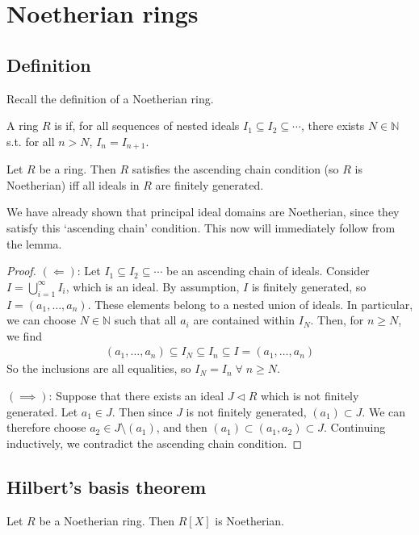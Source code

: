 \section{Noetherian rings}

\subsection{Definition}
Recall the definition of a Noetherian ring.
\begin{definition}
	A ring $R$ is  if, for all sequences of nested ideals $I_1 \subseteq I_2 \subseteq \cdots$, there exists $N \in \mathbb N$ s.t. for all $n > N$, $I_n = I_{n+1}$.
\end{definition}

\begin{lemma}
	Let $R$ be a ring.
	Then $R$ satisfies the ascending chain condition (so $R$ is Noetherian) iff all ideals in $R$ are finitely generated.
\end{lemma}

We have already shown that principal ideal domains are Noetherian, since they satisfy this `ascending chain' condition.
This now will immediately follow from the lemma.

\begin{proof}
	$(\Longleftarrow)$: Let $I_1 \subseteq I_2 \subseteq \cdots$ be an ascending chain of ideals.
	Consider $I = \bigcup_{i=1}^\infty I_i$, which is an ideal.
	By assumption, $I$ is finitely generated, so $I = (a_1, \dots, a_n)$.
	These elements belong to a nested union of ideals.
	In particular, we can choose $N \in \mathbb N$ such that all $a_i$ are contained within $I_N$.
	Then, for $n \geq N$, we find
	\begin{align*}
		(a_1, \dots, a_n) \subseteq I_N \subseteq I_n \subseteq I = (a_1, \dots, a_n)
	\end{align*}
	So the inclusions are all equalities, so $I_N = I_n \; \forall \; n \geq N$.

	$(\implies)$: Suppose that there exists an ideal $J \triangleleft R$ which is not finitely generated.
	Let $a_1 \in J$.
	Then since $J$ is not finitely generated, $(a_1) \subset J$.
	We can therefore choose $a_2 \in J \setminus (a_1)$, and then $(a_1) \subset (a_1, a_2) \subset J$.
	Continuing inductively, we contradict the ascending chain condition.
\end{proof}

\subsection{Hilbert's basis theorem}
\begin{theorem} \label{thm:hilbert}
	Let $R$ be a Noetherian ring.
	Then $R[X]$ is Noetherian.
\end{theorem}

